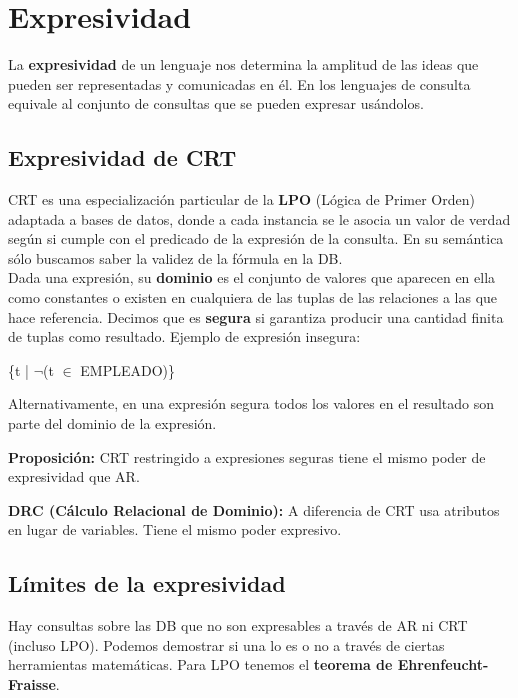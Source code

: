 \section*{Expresividad}
La \textbf{expresividad} de un lenguaje nos determina la amplitud de las ideas que pueden ser representadas y comunicadas en él. En los lenguajes de consulta equivale al conjunto de consultas que se pueden expresar usándolos.

\subsection*{Expresividad de CRT}
CRT es una especialización particular de la \textbf{LPO} (Lógica de Primer Orden) adaptada a bases de datos, donde a cada instancia se le asocia un valor de verdad según si cumple con el predicado de la expresión de la consulta. En su semántica sólo buscamos saber la validez de la fórmula en la DB. \\
Dada una expresión, su \textbf{dominio} es el conjunto de valores que aparecen en ella como constantes o existen en cualquiera de las tuplas de las relaciones a las que hace referencia. Decimos que es \textbf{segura} si garantiza producir una cantidad finita de tuplas como resultado. Ejemplo de expresión insegura:
\begin{SQL}
    \{t | $\lnot$(t $\in$ EMPLEADO)\}
\end{SQL}
Alternativamente, en una expresión segura todos los valores en el resultado son parte del dominio de la expresión.

\textbf{Proposición:} CRT restringido a expresiones seguras tiene el mismo poder de expresividad que AR.

\textbf{DRC (Cálculo Relacional de Dominio):} A diferencia de CRT usa atributos en lugar de variables. Tiene el mismo poder expresivo.

\subsection*{Límites de la expresividad}
Hay consultas sobre las DB que no son expresables a través de AR ni CRT (incluso LPO). Podemos demostrar si una lo es o no a través de ciertas herramientas matemáticas. Para LPO tenemos el \textbf{teorema de Ehrenfeucht-Fraisse}.

